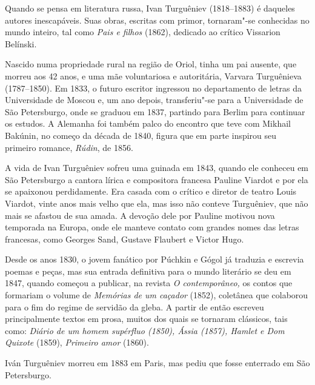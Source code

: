 \noindent{}Quando se pensa em literatura russa, Ivan Turguêniev (1818--1883) é
daqueles autores inescapáveis. Suas obras, escritas com primor,
tornaram"-se conhecidas no mundo inteiro, tal como \emph{Pais e filhos}
(1862), dedicado ao crítico Vissarion Belínski.


Nascido numa propriedade rural na região de Oriol, tinha um pai ausente,
que morreu aos 42 anos, e uma mãe voluntariosa e autoritária, Varvara
Turguênieva (1787--1850). Em 1833, o futuro escritor ingressou no
departamento de letras da Universidade de Moscou e, um ano depois,
transferiu"-se para a Universidade de São Petersburgo, onde se graduou em
1837, partindo para Berlim para continuar os estudos. A Alemanha foi
também palco do encontro que teve com Mikhail Bakúnin, no começo da
década de 1840, figura que em parte inspirou seu primeiro
romance, \emph{Rúdin}, de 1856.

A vida de Ivan Turguêniev sofreu uma guinada em 1843, quando ele
conheceu em São Petersburgo a cantora lírica e compositora francesa
Pauline Viardot e por ela se apaixonou perdidamente. Era casada com o
crítico e diretor de teatro Louis Viardot, vinte anos mais velho que
ela, mas isso não conteve Turguêniev, que não mais se afastou de sua
amada. A devoção dele por Pauline motivou nova temporada na Europa, onde
ele manteve contato com grandes nomes das letras francesas, como Georges
Sand, Gustave Flaubert e Victor Hugo.

Desde os anos 1830, o jovem fanático por Púchkin e Gógol já traduzia e
escrevia poemas e peças, mas sua entrada definitiva para o mundo
literário se deu em 1847, quando começou a publicar, na revista \emph{O
contemporâneo,} os contos que formariam o volume de \emph{Memórias de um
caçador} (1852), coletânea que colaborou para o fim do regime de
servidão da gleba. A partir de então escreveu principalmente
textos em prosa, muitos dos quais se tornaram clássicos, tais como:
\emph{Diário de um homem supérfluo (1850), Ássia (1857), Hamlet e Dom
Quixote} (1859), \emph{Primeiro amor} (1860).

Iván Turguêniev morreu em 1883 em Paris, mas pediu que fosse enterrado
em São Petersburgo.

